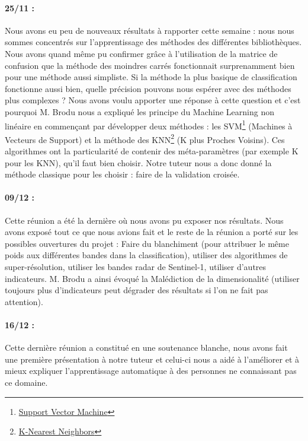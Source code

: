 \documentclass[a4paper,10pt]{report}
\begin{document}
\paragraph{25/11 :} Nous avons eu peu de nouveaux résultats à rapporter cette semaine : nous nous sommes concentrés sur l'apprentissage des méthodes des différentes bibliothèques. Nous avons quand même pu confirmer grâce à l'utilisation de la matrice de confusion que la méthode des moindres carrés fonctionnait surprenamment bien pour une méthode aussi simpliste. Si la méthode la plus basique de classification fonctionne aussi bien, quelle précision pouvons nous espérer avec des méthodes plus complexes ? Nous avons voulu apporter une réponse à cette question et c'est pourquoi M. Brodu nous a expliqué les principe du Machine Learning non linéaire en commençant par développer deux méthodes : les SVM\footnote{\href{https://en.wikipedia.org/wiki/Support_vector_machine}{Support Vector Machine}} (Machines à Vecteurs de Support) et la méthode des KNN\footnote{\href{https://en.wikipedia.org/wiki/K-nearest_neighbors_algorithm}{K-Nearest Neighbors}} (K plus Proches Voisins). Ces algorithmes ont la particularité de contenir des méta-paramètres (par exemple K pour les KNN), qu'il faut bien choisir. Notre tuteur nous a donc donné la méthode classique pour les choisir : faire de la validation croisée.
\paragraph{09/12 :} Cette réunion a été la dernière où nous avons pu exposer nos résultats. Nous avons exposé tout ce que nous avions fait et le reste de la réunion a porté sur les possibles ouvertures du projet : Faire du blanchiment (pour attribuer le même poids aux différentes bandes dans la classification), utiliser des algorithmes de super-résolution, utiliser les bandes radar de Sentinel-1, utiliser d'autres indicateurs. M. Brodu a ainsi évoqué la Malédiction de la dimensionalité (utiliser toujours plus d'indicateurs peut dégrader des résultats si l'on ne fait pas attention).
\paragraph{16/12 :}Cette dernière réunion a constitué en une soutenance blanche, nous avons fait une première présentation à notre tuteur et celui-ci nous a aidé à l'améliorer et à mieux expliquer l'apprentissage automatique à des personnes ne connaissant pas ce domaine.
\end{document}

